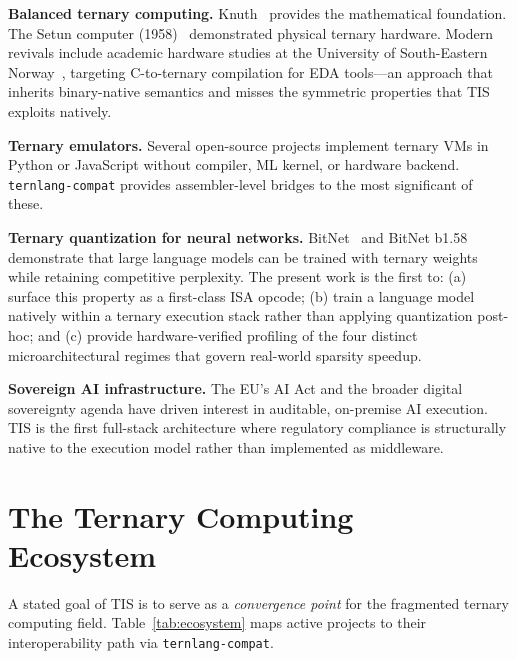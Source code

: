 \documentclass[journal,10pt,twocolumn]{IEEEtran}
\begin{document}
\textbf{Balanced ternary computing.} Knuth~\cite{knuth1997art} provides the
mathematical foundation. The Setun computer (1958)~\cite{brousentsov2002setun}
demonstrated physical ternary hardware. Modern revivals include academic
hardware studies at the University of South-Eastern
Norway~\cite{bos2020ternary}, targeting C-to-ternary compilation for EDA
tools---an approach that inherits binary-native semantics and misses the
symmetric properties that TIS exploits natively.

\textbf{Ternary emulators.} Several open-source projects implement ternary
VMs in Python or JavaScript without compiler, ML kernel, or hardware backend.
\texttt{ternlang-compat} provides assembler-level bridges to the most
significant of these.

\textbf{Ternary quantization for neural networks.} BitNet~\cite{ma2024era}
and BitNet b1.58~\cite{ma2024bitnet158} demonstrate that large language
models can be trained with ternary weights while retaining competitive
perplexity. The present work is the first to: (a) surface this property as a
first-class ISA opcode; (b) train a language model natively within a ternary
execution stack rather than applying quantization post-hoc; and (c) provide
hardware-verified profiling of the four distinct microarchitectural regimes
that govern real-world sparsity speedup.

\textbf{Sovereign AI infrastructure.} The EU's AI Act and the broader
digital sovereignty agenda have driven interest in auditable, on-premise AI
execution. TIS is the first full-stack architecture where regulatory
compliance is structurally native to the execution model rather than
implemented as middleware.

\section{The Ternary Computing Ecosystem}
\label{sec:ecosystem}

A stated goal of TIS is to serve as a \emph{convergence point} for the
fragmented ternary computing field. Table~\ref{tab:ecosystem} maps active
projects to their interoperability path via \texttt{ternlang-compat}.
\end{document}
